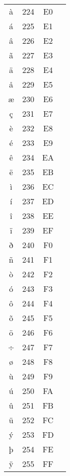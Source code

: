 \documentclass[10pt]{article}
\begin{document}
\begin{tabular}{crcl}
à&224&E0&\\
á&225&E1&\\
â&226&E2&\\
ã&227&E3&\\
ä&228&E4&\\
å&229&E5&\\
æ&230&E6&\\
ç&231&E7&\\
è&232&E8&\\
é&233&E9&\\
ê&234&EA&\\
ë&235&EB&\\
ì&236&EC&\\
í&237&ED&\\
î&238&EE&\\
ï&239&EF&\\
ð&240&F0&\\
ñ&241&F1&\\
ò&242&F2&\\
ó&243&F3&\\
ô&244&F4&\\
õ&245&F5&\\
ö&246&F6&\\
÷&247&F7&\\
ø&248&F8&\\
ù&249&F9&\\
ú&250&FA&\\
û&251&FB&\\
ü&252&FC&\\
ý&253&FD&\\
þ&254&FE&\\
ÿ&255&FF&\\
\end{tabular}
\end{document}
